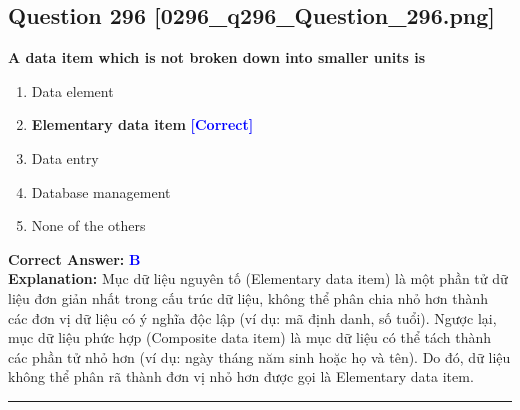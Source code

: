 \documentclass[11pt,a4paper]{article}
\begin{document}
\begin{minipage}{\textwidth}
\subsection*{Question 296 \quad \footnotesize{[0296\_q296\_Question\_296.png]}}
\noindent \textbf{A data item which is not broken down into smaller units is}

\begin{enumerate}[label=\Alph*.]
    \item Data element
    \item \textbf{Elementary data item} \hfill \textcolor{blue}{\textbf{[Correct]}}
    \item Data entry
    \item Database management
    \item None of the others
\end{enumerate}

\noindent \textbf{Correct Answer:} \textcolor{blue}{\textbf{B}} \\[2pt]
\noindent \textbf{Explanation:} Mục dữ liệu nguyên tố (Elementary data item) là một phần tử dữ liệu đơn giản nhất trong cấu trúc dữ liệu, không thể phân chia nhỏ hơn thành các đơn vị dữ liệu có ý nghĩa độc lập (ví dụ: mã định danh, số tuổi). Ngược lại, mục dữ liệu phức hợp (Composite data item) là mục dữ liệu có thể tách thành các phần tử nhỏ hơn (ví dụ: ngày tháng năm sinh hoặc họ và tên). Do đó, dữ liệu không thể phân rã thành đơn vị nhỏ hơn được gọi là Elementary data item.

\par\vspace{0.3cm}
\hrule
\vspace{0.3cm}
\end{minipage}
\end{document}

